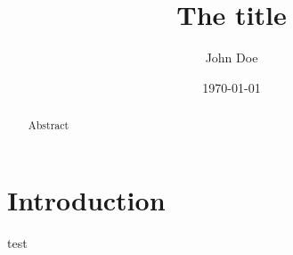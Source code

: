 \documentclass{amsart}
\title{The title}
\author[J.~Doe]{John Doe}
\date{\today}
\numberwithin{equation}{section}
\theoremstyle{plain}
\theoremstyle{definition}
\begin{document}
\begin{abstract}
    Abstract
\end{abstract}
\maketitle
\section{Introduction}
test
% 
% 
\end{document}
